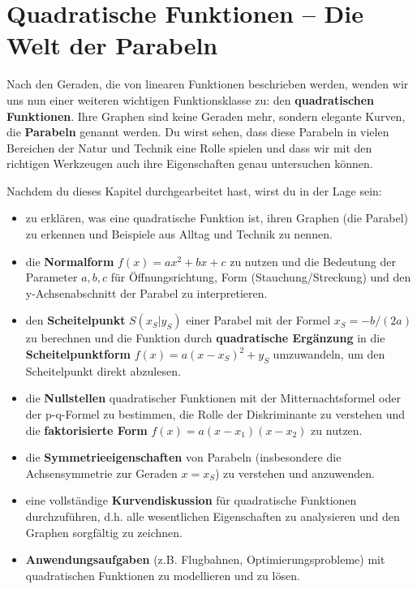 \section{Quadratische Funktionen – Die Welt der Parabeln}
\label{sec:quadratische-funktionen}

Nach den Geraden, die von linearen Funktionen beschrieben werden, wenden wir uns nun einer weiteren wichtigen Funktionsklasse zu: den \textbf{quadratischen Funktionen}. Ihre Graphen sind keine Geraden mehr, sondern elegante Kurven, die \textbf{Parabeln} genannt werden. Du wirst sehen, dass diese Parabeln in vielen Bereichen der Natur und Technik eine Rolle spielen und dass wir mit den richtigen Werkzeugen auch ihre Eigenschaften genau untersuchen können.

\begin{tcolorbox}[colback=blue!5!white, colframe=blue!75!black, title=Was du in diesem Kapitel lernen wirst:]
Nachdem du dieses Kapitel durchgearbeitet hast, wirst du in der Lage sein:
\begin{itemize}[noitemsep, topsep=0pt, leftmargin=*, itemsep=2pt] %
    \item zu erklären, was eine quadratische Funktion ist, ihren Graphen (die Parabel) zu erkennen und Beispiele aus Alltag und Technik zu nennen.
    \item die \textbf{Normalform} $f(x) = ax^2+bx+c$ zu nutzen und die Bedeutung der Parameter $a, b, c$ für Öffnungsrichtung, Form (Stauchung/Streckung) und den y-Achsenabschnitt der Parabel zu interpretieren.
    \item den \textbf{Scheitelpunkt} $S(x_S|y_S)$ einer Parabel mit der Formel $x_S = -b/(2a)$ zu berechnen und die Funktion durch \textbf{quadratische Ergänzung} in die \textbf{Scheitelpunktform} $f(x)=a(x-x_S)^2+y_S$ umzuwandeln, um den Scheitelpunkt direkt abzulesen.
    \item die \textbf{Nullstellen} quadratischer Funktionen mit der Mitternachtsformel oder der p-q-Formel zu bestimmen, die Rolle der Diskriminante zu verstehen und die \textbf{faktorisierte Form} $f(x)=a(x-x_1)(x-x_2)$ zu nutzen.
    \item die \textbf{Symmetrieeigenschaften} von Parabeln (insbesondere die Achsensymmetrie zur Geraden $x=x_S$) zu verstehen und anzuwenden.
    \item eine vollständige \textbf{Kurvendiskussion} für quadratische Funktionen durchzuführen, d.h. alle wesentlichen Eigenschaften zu analysieren und den Graphen sorgfältig zu zeichnen.
    \item \textbf{Anwendungsaufgaben} (z.B. Flugbahnen, Optimierungsprobleme) mit quadratischen Funktionen zu modellieren und zu lösen.

\end{itemize}
\end{tcolorbox}
